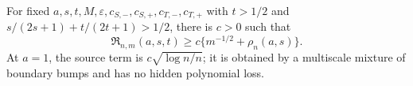 For fixed \(a,s,t,M,\varepsilon,c_{S,-},c_{S,+},c_{T,-},c_{T,+}\) with \(t>1/2\) and \(s/(2s+1)+t/(2t+1)>1/2\), there is \(c>0\) such that \[\mathfrak R_{n,m}(a,s,t)\ge c\{m^{-1/2}+\rho_n(a,s)\}.\] At \(a=1\), the source term is \(c\sqrt{\log n/n}\); it is obtained by a multiscale mixture of boundary bumps and has no hidden polynomial loss.